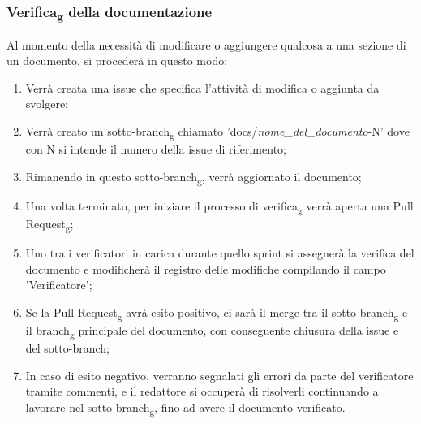         \subsubsection{Verifica\textsubscript{g} della documentazione}
        Al momento della necessità di modificare o aggiungere qualcosa a una sezione di un documento, si procederà in questo modo:
        \begin{enumerate}
            \item Verrà creata una issue che specifica l'attività di modifica o aggiunta da svolgere;
            \item Verrà creato un sotto-branch\textsubscript{g} chiamato 'docs/\textit{nome\_del\_documento}-N' dove con N si intende il numero della issue di riferimento;
            \item Rimanendo in questo sotto-branch\textsubscript{g}, verrà aggiornato il documento;
            \item Una volta terminato, per iniziare il processo di verifica\textsubscript{g} verrà aperta una Pull Request\textsubscript{g};
            \item Uno tra i verificatori in carica durante quello sprint si assegnerà la verifica del documento e modificherà il registro delle modifiche compilando il campo 'Verificatore';
            \item Se la Pull Request\textsubscript{g} avrà esito positivo, ci sarà il merge tra il sotto-branch\textsubscript{g} e il branch\textsubscript{g} principale del documento, con conseguente chiusura della issue e del sotto-branch;
            \item In caso di esito negativo, verranno segnalati gli errori da parte del verificatore tramite commenti, e il redattore si occuperà di risolverli continuando a lavorare nel sotto-branch\textsubscript{g}, fino ad avere il documento verificato.
        \end{enumerate}

